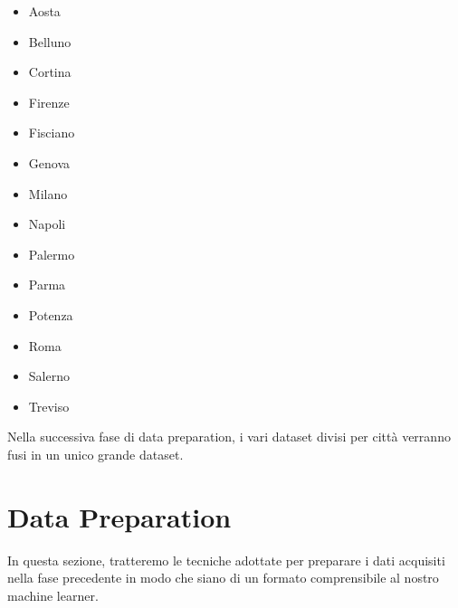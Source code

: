 \documentclass[a4paper, 11pt, oneside]{report}
\begin{document}
                \begin{itemize}
                    \item Aosta
                    \item Belluno
                    \item Cortina
                    \item Firenze
                    \item Fisciano
                    \item Genova
                    \item Milano
                    \item Napoli
                    \item Palermo
                    \item Parma
                    \item Potenza
                    \item Roma
                    \item Salerno
                    \item Treviso
                \end{itemize}
            Nella successiva fase di data preparation, i vari dataset divisi per città verranno fusi in un unico grande
            dataset.

            \newpage
            \section{Data Preparation}
            In questa sezione, tratteremo le tecniche adottate per preparare i dati acquisiti nella fase precedente in
            modo che siano di un formato comprensibile al nostro machine learner.
\end{document}
